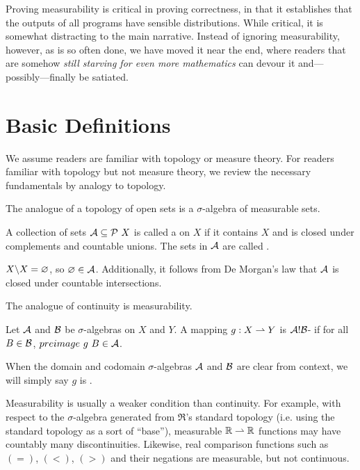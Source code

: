 
Proving measurability is critical in proving correctness, in that it establishes that the outputs of all programs have sensible distributions.
While critical, it is somewhat distracting to the main narrative.
Instead of ignoring measurability, however, as is so often done, we have moved it near the end, where readers that are somehow \emph{still starving for even more mathematics} can devour it and---possibly---finally be satiated.

\section{Basic Definitions}

We assume readers are familiar with topology or measure theory.
For readers familiar with topology but not measure theory, we review the necessary fundamentals by analogy to topology.

The analogue of a topology of open sets is a $\sigma$-algebra of measurable sets.

\begin{definition}
A collection of sets $\mathcal{A} \subseteq \mathcal{P}~X$ is called a  on $X$ if it contains $X$ and is closed under complements and countable unions.
The sets in $\mathcal{A}$ are called .
\end{definition}

$X \backslash X = \varnothing$, so $\varnothing \in \mathcal{A}$.
Additionally, it follows from De Morgan's law that $\mathcal{A}$ is closed under countable intersections.

The analogue of continuity is measurability.

\begin{definition}
Let $\mathcal{A}$ and $\mathcal{B}$ be $\sigma$-algebras on $X$ and $Y$.
A mapping $g : X \rightharpoonup Y$ is $\mathcal{A}!\mathcal{B}$- if for all $B \in \mathcal{B}$, $preimage~g~B \in \mathcal{A}$.
\end{definition}

When the domain and codomain $\sigma$-algebras $\mathcal{A}$ and $\mathcal{B}$ are clear from context, we will simply say $g$ is .

Measurability is usually a weaker condition than continuity.
For example, with respect to the $\sigma$-algebra generated from $\Re$'s standard topology (i.e. using the standard topology as a sort of ``base''), measurable $\mathbb{R} \rightharpoonup \mathbb{R}$ functions may have countably many discontinuities.
Likewise, real comparison functions such as $(=)$, $(<)$, $(>)$ and their negations are measurable, but not continuous.

